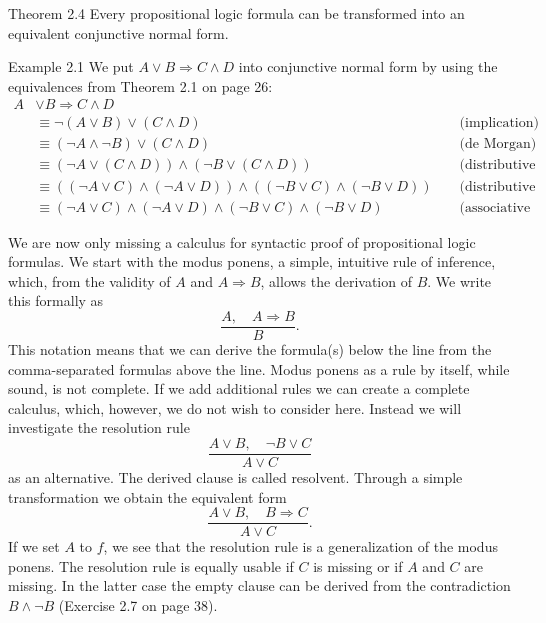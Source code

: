 \documentclass[10pt]{book}
\begin{document}
Theorem 2.4 Every propositional logic formula can be transformed into an equivalent conjunctive normal form.

Example 2.1 We put $A \vee B \Rightarrow C \wedge D$ into conjunctive normal form by using the equivalences from Theorem 2.1 on page 26:
$$
\begin{aligned}
A & \vee B \Rightarrow C \wedge D & & \\
& \equiv \neg(A \vee B) \vee(C \wedge D) & & \text { (implication) } \\
& \equiv(\neg A \wedge \neg B) \vee(C \wedge D) & & \text { (de Morgan) } \\
& \equiv(\neg A \vee(C \wedge D)) \wedge(\neg B \vee(C \wedge D)) & & \text { (distributive law) } \\
& \equiv((\neg A \vee C) \wedge(\neg A \vee D)) \wedge((\neg B \vee C) \wedge(\neg B \vee D)) & & \text { (distributive law) } \\
& \equiv(\neg A \vee C) \wedge(\neg A \vee D) \wedge(\neg B \vee C) \wedge(\neg B \vee D) & & \text { (associative law) }
\end{aligned}
$$

We are now only missing a calculus for syntactic proof of propositional logic formulas. We start with the modus ponens, a simple, intuitive rule of inference, which, from the validity of $A$ and $A \Rightarrow B$, allows the derivation of $B$. We write this formally as
$$
\frac{A, \quad A \Rightarrow B}{B} .
$$
This notation means that we can derive the formula(s) below the line from the comma-separated formulas above the line. Modus ponens as a rule by itself, while sound, is not complete. If we add additional rules we can create a complete calculus, which, however, we do not wish to consider here. Instead we will investigate the resolution rule
\begin{equation*}
\frac{A \vee B, \quad \neg B \vee C}{A \vee C} \tag{2.1}
\end{equation*}
as an alternative. The derived clause is called resolvent. Through a simple transformation we obtain the equivalent form
$$
\frac{A \vee B, \quad B \Rightarrow C}{A \vee C} .
$$
If we set $A$ to $f$, we see that the resolution rule is a generalization of the modus ponens. The resolution rule is equally usable if $C$ is missing or if $A$ and $C$ are missing. In the latter case the empty clause can be derived from the contradiction $B \wedge \neg B$ (Exercise 2.7 on page 38).
\end{document}
